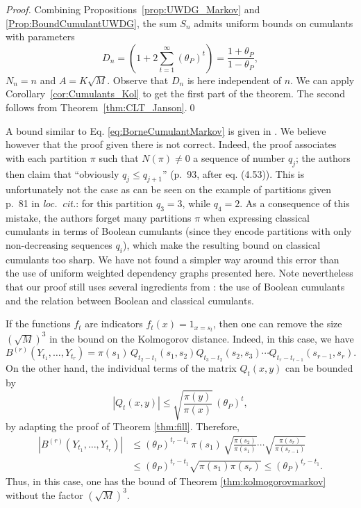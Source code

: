 \documentclass[envcountsame]{svmult}
\begin{document}
\begin{proof}
  Combining Propositions~\ref{prop:UWDG_Markov} and \ref{Prop:BoundCumulantUWDG},
  the sum $S_n$ admits uniform bounds on cumulants with parameters 
$$D_n=\left(1+2\sum_{t=1}^\infty (\theta_P)^t\right) = \frac{1+\theta_P}{1-\theta_P},$$
$N_n=n$ and $A = K\sqrt{M}$. Observe that $D_n$ is here independent of $n$.
We can apply Corollary~\ref{cor:Cumulants_Kol} to get the first part of the theorem.
The second follows from Theorem~\ref{thm:CLT_Janson}.\qed
\end{proof}

\begin{remark}
  A bound similar to Eq. \eqref{eq:BorneCumulantMarkov} is given in 
  \cite[Theorem 4.19]{LivreOrange:Cumulants}.
  We believe however that the proof given there is not correct.
  Indeed, the proof associates with each partition $\pi$ such that $N(\pi) \ne 0$
  a sequence of number $q_j$;
  the authors then claim that ``obviously $q_j \le q_{j+1}$'' (p.~93, after eq. (4.53)).
  This is unfortunately not the case as can be seen on the example
  of partitions given p.~81 in \emph{loc.~cit.}: for this partition $q_3=3$, while $q_4=2$.
  As a consequence of this mistake,
  the authors forget many partitions $\pi$ when expressing classical cumulants
  in terms of Boolean cumulants (since they encode partitions with only non-decreasing sequences $q_i$),
  which make the resulting bound on classical cumulants too sharp. We have not found a simpler way around this error than the use of uniform weighted dependency graphs presented here.
  Note nevertheless that our proof still uses several ingredients from \cite{LivreOrange:Cumulants}:
  the use of Boolean cumulants and the relation between Boolean and classical cumulants.
\end{remark}


\begin{remark}
If the functions $f_t$ are indicators $f_t(x)=1_{x=s_t}$, then one can remove the size $(\sqrt{M})^3$ in the bound on the Kolmogorov distance. Indeed, in this case, we have
$$B^{(r)}(Y_{t_1},\ldots,Y_{t_r}) = \pi(s_1)\,Q_{t_2-t_1}(s_1,s_2)Q_{t_3-t_2}(s_2,s_3)\cdots Q_{t_{r}-t_{r-1}}(s_{r-1},s_r).$$
On the other hand, the individual terms of the matrix $Q_{t}(x,y)$ can be bounded by
$$|Q_{t}(x,y)| \leq \sqrt{\frac{\pi(y)}{\pi(x)}}\,(\theta_P)^t,$$
by adapting the proof of Theorem \ref{thm:fill}. Therefore,
\begin{align*}
\left|B^{(r)}(Y_{t_1},\ldots,Y_{t_r})\right| &\leq (\theta_P)^{t_r-t_1}\, \pi(s_1)\,\sqrt{\frac{\pi(s_2)}{\pi(s_1)}} \cdots \sqrt{\frac{\pi(s_r)}{\pi(s_{r-1})}} \\
&\leq (\theta_P)^{t_r-t_1} \sqrt{\pi(s_1)\pi(s_r)} \leq (\theta_P)^{t_r-t_1}.
\end{align*}
Thus, in this case, one has the bound of Theorem \ref{thm:kolmogorovmarkov} without the factor $(\sqrt{M})^3$.
\end{remark}
\end{document}
